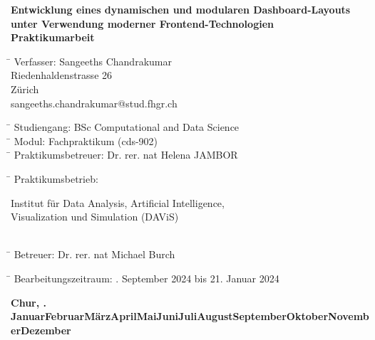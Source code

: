 \documentclass[a4paper, 12pt]{scrartcl}
\begin{document}
\begin{center}
	{\LARGE\textbf{Entwicklung eines dynamischen und modularen Dashboard-Layouts unter Verwendung moderner Frontend-Technologien}}\\
	\vspace{40mm} %
	{\large\textbf{Praktikumarbeit}}\\
	\vspace{40mm}

\begin{flushleft}
	\begin{tabbing}
		\hspace*{73mm}\= \kill
		Verfasser: \> Sangeeths Chandrakumar\\
		\> Riedenhaldenstrasse 26\\
		 Zürich\\
		\> {sangeeths.chandrakumar@stud.fhgr.ch}\\
	\end{tabbing}
	
	\begin{tabbing}
		\hspace*{73mm}\= \kill
		Studiengang: \> BSc Computational and Data Science\\
		\hspace*{73mm}\= \kill
		Modul: \> Fachpraktikum (cds-902)\\
		\hspace*{73mm}\= \kill
		Praktikumsbetreuer: \> Dr. rer. nat Helena JAMBOR\\
	\end{tabbing}

    \begin{tabbing}
        \hspace*{73mm}\= \kill
        Praktikumsbetrieb: \> \parbox[t]{0.6\textwidth}{Institut für Data Analysis, Artificial Intelligence, \\ Visualization und Simulation (DAViS)}\\
        \hspace*{73mm}\= \kill
        Betreuer: \> Dr. rer. nat Michael Burch\\
    \end{tabbing}
 
	\begin{tabbing}
		\hspace*{73mm}\= \kill
		Bearbeitungszeitraum: . September 2024 bis  21. Januar 2024 \\
	\end{tabbing}
	
\end{flushleft}

\vspace{10mm}

\newcommand{\ausgeschriebenerMonat}[1]{%
    \ifcase#1\or Januar\or Februar\or März\or April\or Mai\or Juni\or Juli\or August\or September\or Oktober\or November\or Dezember\fi%
}

\newcommand{\datum}{%
    \textbf{Chur, \number\day.\ausgeschriebenerMonat{\month} \number\year}
}
\datum

\end{center}
\end{document}
